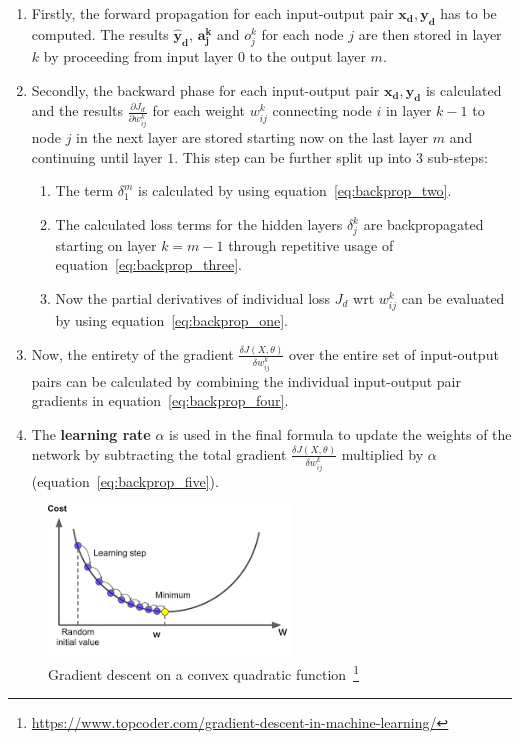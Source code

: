 \begin{enumerate}
	\item Firstly, the forward propagation for each input-output pair $ \boldsymbol{x_d}, \boldsymbol{y_d} $ has to be computed. The results $ \boldsymbol{\hat{y}_d} $, $ \boldsymbol{a_j^k} $ and $ o_j^k $ for each node $ j $ are then stored in layer $ k $ by proceeding from input layer $ 0 $ to the output layer $ m $.
	\item Secondly, the backward phase for each input-output pair $ \boldsymbol{x_d}, \boldsymbol{y_d} $ is calculated and the results $ \frac{\partial J_d}{\partial w_{ij}^{k}} $ for each weight $ w_{ij}^{k} $ connecting node $ i $ in layer $ k - 1 $ to node $ j $ in the next layer are stored starting now on the last layer $ m $ and continuing until layer $ 1 $. This step can be further split up into 3 sub-steps:
	\begin{enumerate}
		\item The term $ \delta_1^m $ is calculated by using equation~\ref{eq:backprop_two}.
		\item The calculated loss terms for the hidden layers $ \delta_j^k $ are backpropagated starting on layer $ k = m - 1 $ through repetitive usage of equation~\ref{eq:backprop_three}.
		\item Now the partial derivatives of individual loss $ J_d $ \gls{wrt} $ w_{ij}^k $ can be evaluated by using equation~\ref{eq:backprop_one}.
	\end{enumerate}
	\item Now, the entirety of the gradient $ \frac{\delta J(X, \theta)}{\delta w_{ij}^k} $ over the entire set of input-output pairs can be calculated by combining the individual input-output pair gradients in equation~\ref{eq:backprop_four}.
	\item The \textbf{learning rate} $ \alpha $ is used in the final formula to update the weights of the network by subtracting the total gradient $ \frac{\delta J(X, \theta)}{\delta w_{ij}^k} $ multiplied by $ \alpha $ (equation~\ref{eq:backprop_five}).
\end{enumerate}
\bigskip

\begin{figure}
	\includegraphics[height=4cm]{img/gradient_descent}
	\caption[Gradient descent on a convex quadratic function]{Gradient descent on a convex quadratic function~\footnote{\url{https://www.topcoder.com/gradient-descent-in-machine-learning/}}}
	\label{fig:gradient_descent}
\end{figure}

